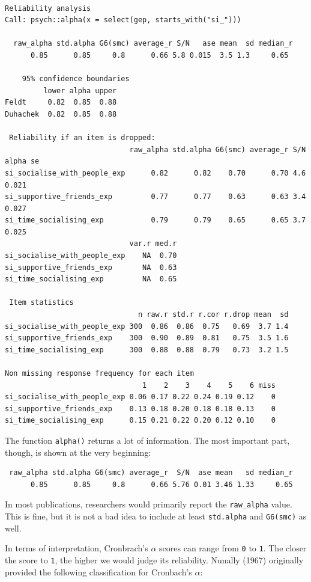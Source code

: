 \documentclass[
  letterpaper,
]{krantz}
\begin{document}
\begin{verbatim}

Reliability analysis   
Call: psych::alpha(x = select(gep, starts_with("si_")))

  raw_alpha std.alpha G6(smc) average_r S/N   ase mean  sd median_r
      0.85      0.85     0.8      0.66 5.8 0.015  3.5 1.3     0.65

    95% confidence boundaries 
         lower alpha upper
Feldt     0.82  0.85  0.88
Duhachek  0.82  0.85  0.88

 Reliability if an item is dropped:
                             raw_alpha std.alpha G6(smc) average_r S/N alpha se
si_socialise_with_people_exp      0.82      0.82    0.70      0.70 4.6    0.021
si_supportive_friends_exp         0.77      0.77    0.63      0.63 3.4    0.027
si_time_socialising_exp           0.79      0.79    0.65      0.65 3.7    0.025
                             var.r med.r
si_socialise_with_people_exp    NA  0.70
si_supportive_friends_exp       NA  0.63
si_time_socialising_exp         NA  0.65

 Item statistics 
                               n raw.r std.r r.cor r.drop mean  sd
si_socialise_with_people_exp 300  0.86  0.86  0.75   0.69  3.7 1.4
si_supportive_friends_exp    300  0.90  0.89  0.81   0.75  3.5 1.6
si_time_socialising_exp      300  0.88  0.88  0.79   0.73  3.2 1.5

Non missing response frequency for each item
                                1    2    3    4    5    6 miss
si_socialise_with_people_exp 0.06 0.17 0.22 0.24 0.19 0.12    0
si_supportive_friends_exp    0.13 0.18 0.20 0.18 0.18 0.13    0
si_time_socialising_exp      0.15 0.21 0.22 0.20 0.12 0.10    0
\end{verbatim}

The function \texttt{alpha()} returns a lot of information. The most
important part, though, is shown at the very beginning:

\begin{verbatim}
 raw_alpha std.alpha G6(smc) average_r  S/N  ase mean   sd median_r
      0.85      0.85     0.8      0.66 5.76 0.01 3.46 1.33     0.65
\end{verbatim}

In most publications, researchers would primarily report the
\texttt{raw\_alpha} value. This is fine, but it is not a bad idea to
include at least \texttt{std.alpha} and \texttt{G6(smc)} as well.

In terms of interpretation, Cronbrach's \(\alpha\) scores can range from
\texttt{0} to \texttt{1}. The closer the score to \texttt{1}, the higher
we would judge its reliability. Nunally (1967) originally provided the
following classification for Cronbach's \(\alpha\):
\end{document}
